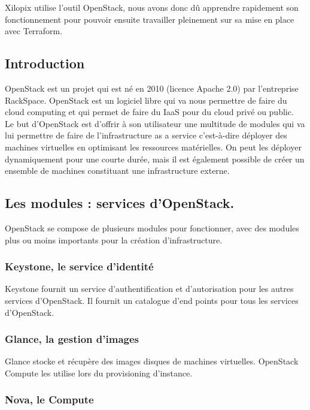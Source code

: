 \documentclass[]{article}
\begin{document}
Xilopix utilise l'outil OpenStack, nous avons donc dû apprendre
rapidement son fonctionnement pour pouvoir ensuite travailler pleinement
sur sa mise en place avec Terraform.

\subsection{Introduction}\label{introduction-1}

OpenStack est un projet qui est né en 2010 (licence Apache 2.0) par
l'entreprise RackSpace. OpenStack est un logiciel libre qui va nous
permettre de faire du cloud computing et qui permet de faire du IaaS
pour du cloud privé ou public.\\
Le but d'OpenStack est d'offrir à son
utilisateur une multitude de modules qui va lui permettre de faire de
l'infrastructure as a service c'est-à-dire déployer des machines
virtuelles en optimisant les ressources matérielles. On peut les
déployer dynamiquement pour une courte durée, mais il est également
possible de créer un ensemble de machines constituant une
infrastructure externe.

\subsection{Les modules : services
d'OpenStack.}\label{les-modules-services-dOpenStack.}

OpenStack se compose de plusieurs modules pour fonctionner, avec des
modules plus ou moins importants pour la création d'infrastructure.

\subsubsection{Keystone, le service
d'identité}\label{keystone-le-service-didentituxe9}

Keystone fournit un service d'authentification et d'autorisation pour les autres
services d'OpenStack. Il fournit un catalogue d'end points pour tous les
services d'OpenStack.

\subsubsection{Glance, la gestion
d'images}\label{glance-la-gestion-dimages}

Glance stocke et récupère des images disques de machines virtuelles. OpenStack
Compute les utilise lors du provisioning d'instance.

\subsubsection{Nova, le Compute}\label{nova-le-compute}
\end{document}
